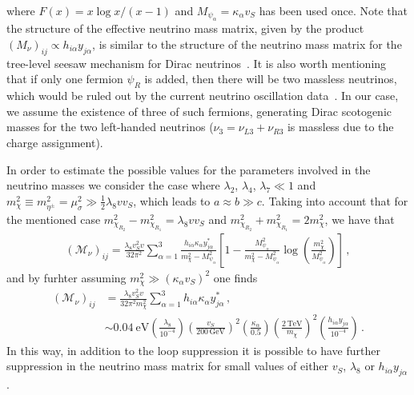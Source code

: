 \documentclass[12pt]{article}
\begin{document}
%
where $F(x) =x \log x/(x-1)$ and $M_{\psi_\alpha}=\kappa_{\alpha}v_S$ has been used once. 
Note that the structure of the effective neutrino mass matrix, given by the
product $(M_{\nu})_{ij} \propto h_{i \alpha} y_{j\alpha}$, is similar to
the structure of the neutrino mass matrix for the tree-level seesaw
mechanism for Dirac neutrinos~\cite{Chulia:2016ngi}. 
It is also worth mentioning that if only one
fermion $\psi_R$ is added, then there will be two massless neutrinos, which
would be ruled out by the current neutrino oscillation data~\cite{deSalas:2017kay}. 
In our case, we assume the
existence of three of such fermions, generating Dirac scotogenic masses for
the two left-handed neutrinos ($\nu_{3}=\nu_{L3}+\nu_{R3}$ is massless due to the charge assignment). 

In order to estimate the possible values for the parameters involved in the neutrino masses we consider the case where $\lambda_2$, $\lambda_4$, $\lambda_7 \ll 1$ and $m_\chi^2\equiv m_{\eta^{\pm}}^2 = \mu^2_{\sigma} \gg \frac{1}{2} \lambda_8 v v_S$, which leads to $a\approx b\gg c$. 
Taking into account that for the mentioned case $m^2_{\chi_{R_{2}}}-m^2_{\chi_{R_{1}}} = \lambda_8 v v_{S}$ and $m^2_{\chi_{R_{2}}}+m^2_{\chi_{R_{1}}} = 2 m^2_\chi$, we have that
%
\begin{align*}
(\mathcal{M}_{\nu})_{ij} = \frac{\lambda_8 v_S^2 v}{32 \pi^{2}} \sum_{\alpha=1}^{3} \frac{h_{i \alpha} \kappa_\alpha y^{*}_{j\alpha}} {m_\chi^{2}-M_{\psi_{\alpha}}^{2}} \left[1 - \frac{M_{\psi_{\alpha}}^{2}}{m_\chi^{2}-M_{\psi_{\alpha}}^{2}} \log \left( \frac{m_{\chi}^{2}}{M_{\psi_{\alpha}}^{2}} \right)\right]\,,
\end{align*}
%
and by furhter assuming $m_{\chi}^{2} \gg (\kappa_\alpha v_S)^2$ one finds 
%
\begin{align}
(\mathcal{M}_{\nu})_{ij} & = \frac{\lambda_8 v_S^2 v}{32 \pi^{2}m_{\chi}^{2}} \sum_{\alpha=1}^{3} h_{i \alpha} \kappa_{\alpha}y^{*}_{j\alpha}\,, \\
& \sim 0.04~\text{eV} \left( \frac{\lambda_8}{10^{-4}}\right) \left( \frac{v_{S}}{200\,  \text{GeV}}\right)^2 \left( \frac{\kappa_\alpha}{0.5}\right) \left( \frac{2\, \text{TeV}}{m_{\chi}}\right)^{2} \left( \frac{h_{i \alpha} y_{j\alpha}}{10^{-4}}\right)\,. \nonumber
\end{align}
%
In this way, in addition to the loop suppression it is possible to 
have further suppression in the neutrino mass matrix for small values
of either $v_S$, $\lambda_8$ or $h_{i \alpha} y_{j\alpha}$.
\end{document}
